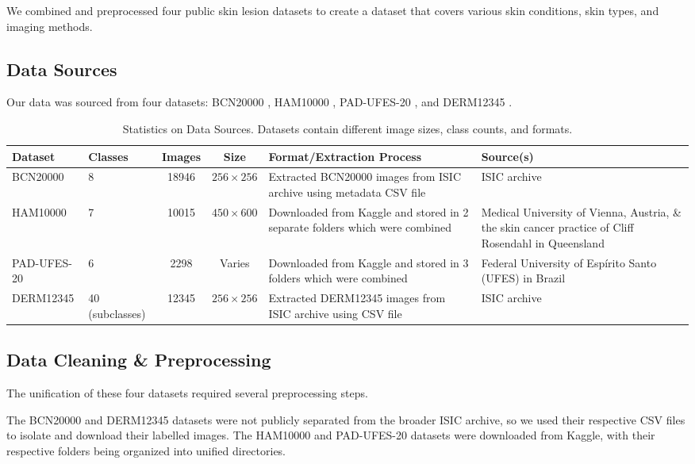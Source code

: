 \documentclass{article} %
\begin{document}
We combined and preprocessed four public skin lesion datasets to create a dataset that covers various skin conditions, skin types, and imaging methods.

\subsection{Data Sources}

Our data was sourced from four datasets: BCN20000 \citep{isic_bcn20000}, HAM10000 \citep{ham10000_dataset}, PAD-UFES-20 \citep{pad_ufes_dataset}, and DERM12345 \citep{yilmaz2024derm12345}.

\begin{table}[H]
\caption{Statistics on Data Sources. Datasets contain different image sizes, class counts, and formats.}
\label{data-sources}
\begin{center}
\footnotesize
\begin{tabularx}{\textwidth}{|l|p{1cm}|c|c|X|X|}
\hline
\textbf{Dataset} & \textbf{Classes} & \textbf{Images} & \textbf{Size} & \textbf{Format/Extraction Process} & \textbf{Source(s)} \\
\hline
BCN20000 & 8 & 18946 & $256 \times 256$ & Extracted BCN20000 images from ISIC archive using metadata CSV file & ISIC archive \\
\hline
HAM10000 & 7 & 10015 & $450 \times 600$ & Downloaded from Kaggle and stored in 2 separate folders which were combined & Medical University of Vienna, Austria, \& the skin cancer practice of Cliff Rosendahl in Queensland \\
\hline
PAD-UFES-20 & 6 & 2298 & Varies & Downloaded from Kaggle and stored in 3 folders which were combined & Federal University of Espírito Santo (UFES) in Brazil \\
\hline
DERM12345 & 40 (subclasses) & 12345 & $256 \times 256$ & Extracted DERM12345 images from ISIC archive using CSV file & ISIC archive \\
\hline
\end{tabularx}
\end{center}
\end{table}

\subsection{Data Cleaning \& Preprocessing}

The unification of these four datasets required several preprocessing steps.

The BCN20000 \citep{isic_bcn20000} and DERM12345 \citep{yilmaz2024derm12345} datasets were not publicly separated from the broader ISIC archive, so we used their respective CSV files to isolate and download their labelled images. The HAM10000 \citep{ham10000_dataset} and PAD-UFES-20 \citep{pad_ufes_dataset} datasets were downloaded from Kaggle, with their respective folders being organized into unified directories.
\end{document}
